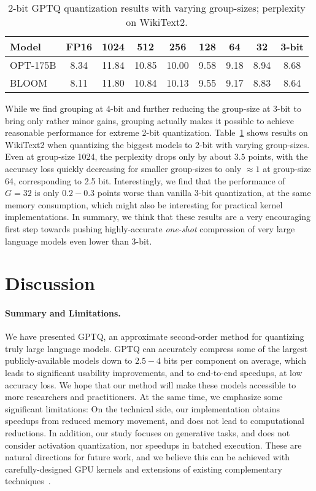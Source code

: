 \begin{table}[h]
    \centering
    \begin{tabular}{|l|c|cccccc|c|}
        \toprule
        Model & FP16 & 1024 & 512 & 256 & 128 & 64 & 32 & 3-bit \\
        \midrule
        OPT-175B & 8.34 & 11.84 & 10.85 & 10.00 & 9.58 & 9.18 & 8.94 & 8.68 \\
        BLOOM & 8.11 & 11.80 & 10.84 & 10.13 & 9.55 & 9.17 & 8.83 & 8.64 \\
        \bottomrule
    \end{tabular}
    \vspace{5pt}
    \caption{2-bit GPTQ quantization results with varying group-sizes; perplexity on WikiText2.}
    \label{tab:2bit}
    \vspace{-15pt}
\end{table}

While we find grouping at 4-bit and further reducing the group-size at 3-bit to bring only rather minor gains, grouping actually makes it possible to achieve reasonable performance for extreme 2-bit quantization. Table~\ref{tab:2bit} shows results on WikiText2 when quantizing the biggest models to 2-bit with varying group-sizes. Even at group-size 1024, the perplexity drops only by about $3.5$ points, with the accuracy loss quickly decreasing for smaller group-sizes to only $\approx 1$ at group-size 64, corresponding to 2.5 bit. Interestingly, we find that the performance of $G = 32$ is only $0.2 - 0.3$ points worse than vanilla 3-bit quantization, at the same memory consumption, which might also be interesting for practical kernel implementations. In summary, we think that these results are a very encouraging first step towards pushing highly-accurate \emph{one-shot} compression of very large language models even lower than 3-bit.

\section{Discussion}

\paragraph{Summary and Limitations.} 
We have presented GPTQ, an approximate second-order method for quantizing truly large language models. 
GPTQ can accurately compress some of the largest publicly-available models down to $2.5 - 4$ bits per component on average, which leads to significant usability improvements, and to end-to-end speedups, at low accuracy loss. 
We hope that our method will make these models accessible to more researchers and practitioners. 
At the same time, we emphasize some significant limitations: 
On the technical side, our implementation obtains speedups from reduced memory movement, and does not lead to computational reductions. 
In addition, our study focuses on generative tasks, and does not consider activation quantization, nor speedups in batched execution.  
These are natural directions for future work, and we believe this can be achieved with carefully-designed GPU kernels and extensions of existing complementary techniques~\cite{yao2022zeroquant, wu2022extreme}.

